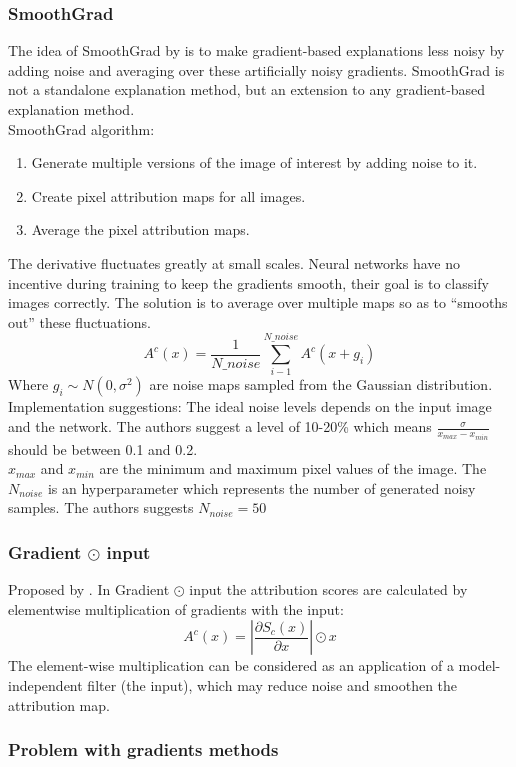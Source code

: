 \subsubsection{SmoothGrad}
The idea of SmoothGrad by \cite{DBLP:journals/corr/SmilkovTKVW17} is to make gradient-based explanations less
noisy by adding noise and averaging over these artificially noisy gradients. SmoothGrad is not a standalone explanation method, but an extension to any gradient-based
explanation method.\\

SmoothGrad algorithm:
\begin{enumerate}
    \item Generate multiple versions of the image of interest by adding noise to it.
    \item Create pixel attribution maps for all images.
    \item Average the pixel attribution maps.
\end{enumerate}

The derivative fluctuates greatly at small scales. Neural networks have no incentive during training
to keep the gradients smooth, their goal is to classify images correctly. The solution is to average over multiple maps so as to “smooths out” these fluctuations.\\
\begin{equation*}
    A^c(x) = \frac{1}{N\_noise}\sum_{i-1}^{N\_noise} A^c(x+g_i)
\end{equation*}
Where $g_i\sim N(0, \sigma^2)$ are noise maps sampled from the Gaussian distribution.\\

Implementation suggestions: The ideal noise levels depends on the input image and the network. The authors suggest a level of 10-20\% which means $\frac{\sigma}{x_{max}-x_{min}}$ should be between 0.1 and 0.2.\\
$x_{max}$ and $x_{min}$ are the minimum and maximum pixel values of the image. The $N_{noise}$ is an hyperparameter which represents the number of generated noisy samples. The authors suggests $N_{noise}=50$

\subsubsection{Gradient $\odot$ input}
Proposed by \cite{DBLP:journals/corr/ShrikumarGSK16}. In Gradient $\odot$ input the attribution scores are calculated by elementwise multiplication of gradients with the input:
\begin{equation*}
    A^c(x) = |\frac{\partial S_c(x)}{\partial x}| \odot x
\end{equation*}
The element-wise multiplication can be considered as an application of a model-independent filter
(the input), which may reduce noise and smoothen the attribution map.

\subsubsection{Problem with gradients methods}
